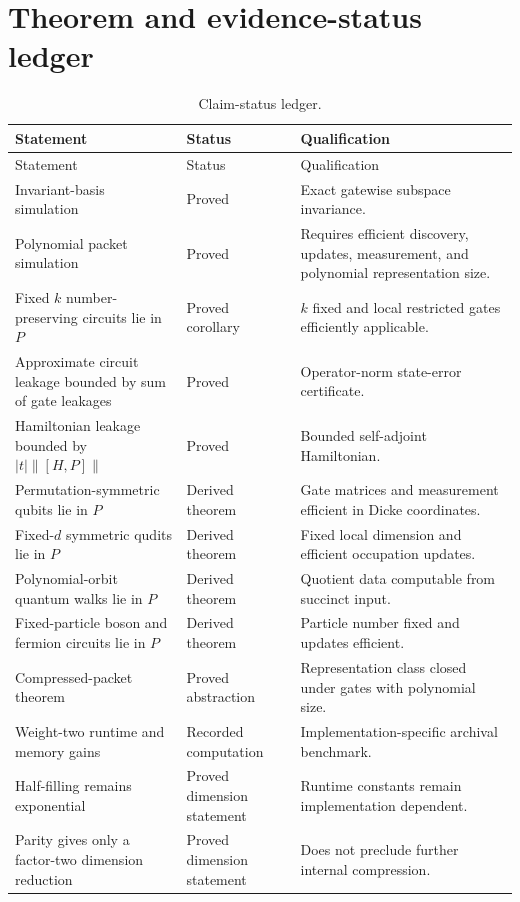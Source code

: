 \chapter{Theorem and evidence-status ledger}
\label{app:status}

\begin{longtable}{@{}L{.31\textwidth}L{.16\textwidth}L{.43\textwidth}@{}}
\caption{Claim-status ledger.}\\
\toprule
Statement & Status & Qualification\\
\midrule
\endfirsthead
\toprule
Statement & Status & Qualification\\
\midrule
\endhead
Invariant-basis simulation & Proved & Exact gatewise subspace invariance.\\
Polynomial packet simulation & Proved & Requires efficient discovery, updates, measurement, and polynomial representation size.\\
Fixed $k$ number-preserving circuits lie in $P$ & Proved corollary & $k$ fixed and local restricted gates efficiently applicable.\\
Approximate circuit leakage bounded by sum of gate leakages & Proved & Operator-norm state-error certificate.\\
Hamiltonian leakage bounded by $|t|\|[H,P]\|$ & Proved & Bounded self-adjoint Hamiltonian.\\
Permutation-symmetric qubits lie in $P$ & Derived theorem & Gate matrices and measurement efficient in Dicke coordinates.\\
Fixed-$d$ symmetric qudits lie in $P$ & Derived theorem & Fixed local dimension and efficient occupation updates.\\
Polynomial-orbit quantum walks lie in $P$ & Derived theorem & Quotient data computable from succinct input.\\
Fixed-particle boson and fermion circuits lie in $P$ & Derived theorem & Particle number fixed and updates efficient.\\
Compressed-packet theorem & Proved abstraction & Representation class closed under gates with polynomial size.\\
Weight-two runtime and memory gains & Recorded computation & Implementation-specific archival benchmark.\\
Half-filling remains exponential & Proved dimension statement & Runtime constants remain implementation dependent.\\
Parity gives only a factor-two dimension reduction & Proved dimension statement & Does not preclude further internal compression.\\

\end{longtable}
